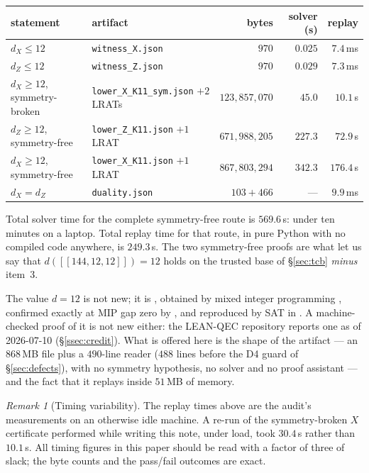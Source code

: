\documentclass[11pt]{amsart}
\newcommand{\dX}{d_{X}}
\newcommand{\dZ}{d_{Z}}
\newcommand{\gross}{[[144,12,12]]}
\theoremstyle{plain}
\theoremstyle{definition}
\theoremstyle{remark}
\newtheorem{remark}[theorem]{Remark}
\begin{document}
\begin{center}
\small
\begin{tabular}{llrrr}
\toprule
statement & artifact & bytes & solver (s) & replay \\
\midrule
$\dX\le 12$ & \texttt{witness\_X.json} & $970$ & $0.025$ & $7.4$\,ms\\
$\dZ\le 12$ & \texttt{witness\_Z.json} & $970$ & $0.029$ & $7.3$\,ms\\
$\dX\ge 12$, symmetry-broken & \texttt{lower\_X\_K11\_sym.json} $+2$ LRATs
  & $123{,}857{,}070$ & $45.0$ & $10.1$\,s\\
$\dZ\ge 12$, symmetry-free & \texttt{lower\_Z\_K11.json} $+1$ LRAT
  & $671{,}988{,}205$ & $227.3$ & $72.9$\,s\\
$\dX\ge 12$, symmetry-free & \texttt{lower\_X\_K11.json} $+1$ LRAT
  & $867{,}803{,}294$ & $342.3$ & $176.4$\,s\\
$\dX=\dZ$ & \texttt{duality.json} & $103+466$ & --- & $9.9$\,ms\\
\bottomrule
\end{tabular}
\end{center}

\noindent Total solver time for the complete symmetry-free route is
$569.6$\,s: under ten minutes on a laptop. Total replay time for that route,
in pure Python with no compiled code anywhere, is $249.3$\,s. The two
symmetry-free proofs are what let us say that $d(\gross)=12$ holds on the
trusted base of \S\ref{sec:tcb} \emph{minus} item~3.

The value $d=12$ is not new; it is \cite[Table 3]{BCGMRY}, obtained by mixed
integer programming \cite{LandahlAndersonRice}, confirmed exactly at MIP gap
zero by \cite{CruzBenito}, and reproduced by SAT in
\cite{ChenJafariLai}. A machine-checked proof of it is not new either: the
LEAN-QEC repository reports one as of 2026-07-10 (\S\ref{ssec:credit}). What is
offered here is the shape of the artifact --- an $868$\,MB file plus a
$490$-line reader ($488$ lines before the D4 guard of \S\ref{sec:defects}),
with no symmetry hypothesis, no solver and no proof
assistant --- and the fact that it replays inside $51$\,MB of memory.

\begin{remark}[Timing variability]
The replay times above are the audit's measurements on an otherwise idle
machine. A re-run of the symmetry-broken $X$ certificate performed while
writing this note, under load, took $30.4$\,s rather than $10.1$\,s. All timing
figures in this paper should be read with a factor of three of slack; the byte
counts and the pass/fail outcomes are exact.
\end{remark}
\end{document}
